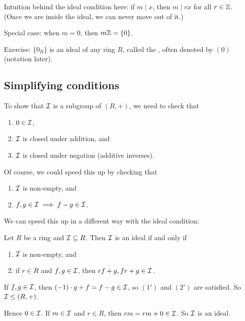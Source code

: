 \documentclass[12pt,letterpaper]{report}
\begin{document}
Intuition behind the ideal condition here: if $m \mid x$, then $m \mid rx$ for all $r \in \mathbb{Z}$.
(Once we are inside the ideal, we can never move out of it.)

Special case: when $m = 0$, then $m\mathbb{Z} = \{0\}$.

Exercise: $\{0_R\}$ is an ideal of any ring $R$, called the , often denoted by
$(0)$ (notation later).

\pagebreak
\subsection{Simplifying conditions}

To show that $\mathcal{I}$ is a subgroup of $(R, +)$, we need to check that
\begin{enumerate}
  \item $0 \in \mathcal{I}$,
  \item $\mathcal{I}$ is closed under addition, and
  \item $\mathcal{I}$ is closed under negation (additive inverses).
\end{enumerate}
Of course, we could speed this up by checking that
\begin{enumerate}[label={\arabic*$'$.}]
  \item $\mathcal{I}$ is non-empty, and
  \item $f, g \in \mathcal{I} \implies f - g \in \mathcal{I}$.
\end{enumerate}

We can speed this up in a different way with the ideal condition:

\begin{lem}{}{}
  Let $R$ be a ring and $\mathcal{I} \subseteq R$.
  Then $\mathcal{I}$ is an ideal if and only if
  \begin{enumerate}
    \item $\mathcal{I}$ is non-empty, and
    \item if $r \in R$ and $f, g \in \mathcal{I}$, then $rf + g, fr + g \in \mathcal{I}$.
  \end{enumerate}
\end{lem}

\begin{thmproof}
  If $f, g \in \mathcal{I}$, then $(-1) \cdot g + f = f - g \in \mathcal{I}$, so $(1')$ and $(2')$
  are satisfied.
  So $\mathcal{I} \leq (R, +)$.

  Hence $0 \in \mathcal{I}$.
  If $m \in \mathcal{I}$ and $r \in R$, then $rm = rm + 0 \in \mathcal{I}$.
  So $\mathcal{I}$ is an ideal.
\end{thmproof}
\end{document}
